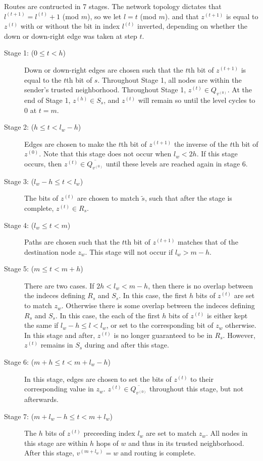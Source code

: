\documentclass{sig-alternate-05-2015}
\begin{document}
Routes are contructed in 7 stages.
The network topology dictates that $l^{(t+1)} = l^{(t)} + 1$ (mod $m$),
so we let $l = t$ (mod $m$).
and that $z^{(t+1)}$ is equal to $z^{(t)}$ with or without the bit in index
$l^{(t)}$ inverted, depending on whether the down or down-right edge was
taken at step $t$.
\begin{description}
\item[Stage 1: ($0 \leq t < h$)]{
Down or down-right edges
are chosen such that the $t$th bit of $z^{(t+1)}$ is equal to the $t$th bit
of $s$.
Throughout Stage 1, all nodes are within the sender's trusted neighborhood.
Throughout Stage 1, $z^{(t)} \in Q_{v^{(0)}}$.
At the end of Stage 1, $z^{(h)} \in S_s$, and $z^{(t)}$ will remain so until the level cycles to $0$ at $t = m$.
}
\item[Stage 2: ($h \leq t < l_w - h$)]{
Edges are chosen to make the $t$th bit of
$z^{(t+1)}$ the inverse of the $t$th bit of $z^{(0)}$.
Note that this stage does not occur when $l_w < 2h$.
If this stage occurs, then $z^{(t)} \in \overline{Q_{v^{(0)}}}$ until these
levels are reached again in stage 6.
}
\item[Stage 3: ($l_w - h \leq t < l_w$)]{
The bits of $z^{(t)}$ are chosen to match $\tilde{s}$,
such that after the stage is complete, $z^{(t)} \in R_s$.
}
\item[Stage 4: ($l_w \leq t < m$)]{
Paths are chosen such that the $t$th bit of $z^{(t+1)}$ matches that of the
destination node $z_w$.
This stage will not occur if $l_w > m - h$.
}
\item[Stage 5: ($m \leq t < m + h$)]{
There are two cases.
If $2h < l_w < m - h$,
then there is no overlap between the indeces defining $R_s$ and $S_s$.
In this case, the first $h$ bits of $z^{(t)}$ are set to
match $z_w$.
Otherwise there is some overlap between the indeces defining $R_s$ and
$S_s$.
In this case, the each of the first $h$ bits of $z^{(t)}$ is either kept the
same if $l_w - h \leq l < l_w$, or set to the corresponding bit of $z_w$
otherwise.
In this stage and after, $z^{(t)}$ is no longer guaranteed to be in $R_s$.
However, $z^{(t)}$ remains in $S_s$ during and after this stage.
}
\item[Stage 6: ($m + h \leq t < m + l_w - h$)]{
In this stage, edges are chosen to set the bits of $z^{(t)}$ to their
corresponding value in $z_w$.
$z^{(t)} \in \overline{Q_{v^{(0)}}}$ throughout this stage,
but not afterwards.
}
\item[Stage 7: ($m + l_w - h \leq t < m + l_w$)] {
The $h$ bits of $z^{(t)}$
preceeding index $l_w$ are set to match $z_w$.
All nodes in this stage are within $h$ hops of $w$ and thus in its trusted
neighborhood.
After this stage, $v^{(m + l_w)} = w$ and routing is complete.
}
\end{description}
\end{document}
